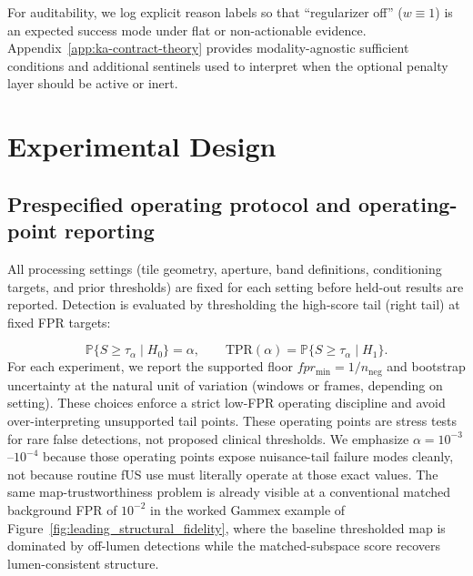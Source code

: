 \documentclass[11pt]{article}
\newif\ifPAPERONLY
\newcommand{\SuppOrApp}[1]{\ifPAPERONLY Supplementary Material\else Appendix~\ref{#1}\fi}
\begin{document}
For auditability, we log explicit reason labels so that ``regularizer off'' ($w\equiv 1$) is an expected success mode under flat or non-actionable evidence. \SuppOrApp{app:ka-contract-theory} provides modality-agnostic sufficient conditions and additional sentinels used to interpret when the optional penalty layer should be active or inert.
\fi

\section{Experimental Design}
\label{sec:experimental-design}

\subsection{Prespecified operating protocol and operating-point reporting}
\label{sec:eval}
\ifPAPERONLY
All processing settings (tile geometry, aperture, band definitions, and adaptive threshold) are fixed for each setting before held-out results are reported. Detection is evaluated by thresholding the high-score tail (right tail) at fixed FPR targets:
\else
All processing settings (tile geometry, aperture, band definitions, conditioning targets, and prior thresholds) are fixed for each setting before held-out results are reported. Detection is evaluated by thresholding the high-score tail (right tail) at fixed FPR targets:
\fi
\[
  \mathbb{P}\{S\ge \tau_\alpha\mid H_0\}=\alpha,\qquad
  \mathrm{TPR}(\alpha)=\mathbb{P}\{S\ge \tau_\alpha\mid H_1\}.
\]
For each experiment, we report the supported floor $fpr_{\min}=1/n_{\mathrm{neg}}$ and bootstrap uncertainty at the natural unit of variation (windows or frames, depending on setting). These choices enforce a strict low-FPR operating discipline and avoid over-interpreting unsupported tail points.
These operating points are stress tests for rare false detections, not proposed clinical thresholds.
We emphasize $\alpha=10^{-3}$--$10^{-4}$ because those operating points expose nuisance-tail failure modes cleanly, not because routine fUS use must literally operate at those exact values. The same map-trustworthiness problem is already visible at a conventional matched background FPR of $10^{-2}$ in the worked Gammex example of Figure~\ref{fig:leading_structural_fidelity}, where the baseline thresholded map is dominated by off-lumen detections while the matched-subspace score recovers lumen-consistent structure.
\end{document}
